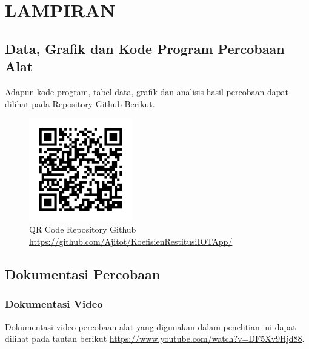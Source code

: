 \chapter*{LAMPIRAN} 

\setcounter{\thechapter}{L}

\section{Data, Grafik dan Kode Program Percobaan Alat}
Adapun kode program, tabel data, grafik dan analisis hasil percobaan dapat dilihat pada Repository Github Berikut.
\begin{figure}[htbp]
    \centering
    \includegraphics[width=0.4\textwidth]{images/qrcode_lampiran.png}
    \caption{QR Code Repository Github
    \url{https://github.com/Ajitot/KoefisienRestitusiIOTApp/}
    }
    \label{fig:qrcode_lampiran}
\end{figure}

\section{Dokumentasi Percobaan}
\subsection{Dokumentasi Video}

Dokumentasi video percobaan alat yang digunakan dalam penelitian ini dapat dilihat pada tautan berikut \url{https://www.youtube.com/watch?v=DF5Xv9Hjd88}.

